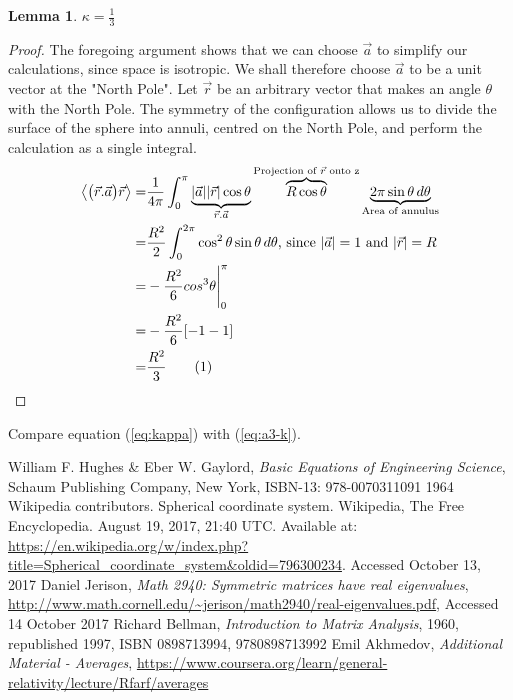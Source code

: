 \documentclass[]{article}
\newcommand\numberthis{\addtocounter{equation}{1}\tag{\theequation}}
\newtheorem{lemma}{Lemma}
\begin{document}
\begin{lemma}
	$\kappa=\frac{1}{3}$
\end{lemma}
\begin{proof}
	The foregoing argument shows that we can choose $\vec{a}$ to simplify our calculations, since space is isotropic. We shall therefore choose $\vec{a}$ to be a unit vector at the "North Pole". Let $\vec{r}$ be an arbitrary vector that makes an angle $\theta$ with the North Pole. The symmetry of the configuration allows us to divide the surface of the sphere into annuli, centred on the North Pole, and perform the calculation as a single integral.
	\begin{align*}
	\left\langle \big(\vec{r}.\vec{a}\big)\vec{r} \right\rangle=&\frac{1}{4\pi}\int_{0}^{\pi}\underbrace{|\vec{a}||\vec{r}|\cos\theta}_{\vec{r}.\vec{a}}\overbrace{R \cos \theta}^{\text{Projection of $\vec{r}$ onto z}}\underbrace{2\pi \sin\theta \,d\theta}_\text{Area of annulus}\\
	=& \frac{R^2}{2}\int_{0}^{2\pi}\cos^2 \theta \sin \theta \,d \theta\text{, since $|\vec{a}|=1$ and $|\vec{r}|=R$}\\
	=& - \frac{R^2}{6} cos^3\theta\Bigg |_0^{\pi}\\
	=& - \frac{R^2}{6} [-1-1]\\
	=& \frac{R^2}{3} \numberthis \label{eq:kappa}
	\end{align*}
\end{proof}
Compare equation (\ref{eq:kappa}) with (\ref{eq:a3-k}).
 
\begin{thebibliography}{9}\label{section:biblio}
	\raggedright
	William F. Hughes \& Eber W. Gaylord,
	\emph{Basic Equations of Engineering Science},
	Schaum Publishing Company, New York,
	ISBN-13: 978-0070311091
	1964
	Wikipedia contributors. Spherical coordinate system. Wikipedia, The Free Encyclopedia. August 19, 2017, 21:40 UTC. Available at: 
	\url{https://en.wikipedia.org/w/index.php?title=Spherical_coordinate_system&oldid=796300234}.
	Accessed
	October 13, 2017
	Daniel Jerison,
	\emph{Math 2940: Symmetric matrices have real eigenvalues},
	\url{http://www.math.cornell.edu/~jerison/math2940/real-eigenvalues.pdf},
	Accessed 14 October 2017
	Richard Bellman,
	\emph{Introduction to Matrix Analysis},
	1960, republished 1997,
	ISBN	0898713994, 9780898713992
	Emil Akhmedov,
	\emph{Additional Material - Averages},
	\url{https://www.coursera.org/learn/general-relativity/lecture/Rfarf/averages}
\end{thebibliography}
\end{document}
